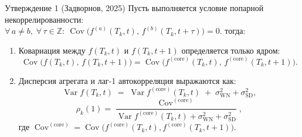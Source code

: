 \documentclass[14pt,a4paper]{article}
\begin{document}
\begin{theorem}{Утверждение 1 (Задворнов, 2025)}
Пусть выполняется условие попарной некоррелированности:
\(
  \forall\,a \neq b,\;\forall\,\tau \in \mathbb{Z}:\ 
  \operatorname{Cov}\bigl(f^{(a)}(T_k,t),\,f^{(b)}(T_k,t+\tau)\bigr) = 0.
\)
тогда:
\begin{enumerate}
\item Ковариация между \(f(T_k,t)\) и \(f(T_k,t+1)\) определяется только ядром:
  \[
    \operatorname{Cov}\bigl(f(T_k,t),\,f(T_k,t+1)\bigr)
    =
    \operatorname{Cov}\bigl(f^{(\mathrm{core})}(T_k,t),\,f^{(\mathrm{core})}(T_k,t+1)\bigr).
  \]
\item Дисперсия агрегата и лаг-1 автокорреляция выражаются как:
  \[
    \operatorname{Var} f(T_k,t)
    \;=\;
    \operatorname{Var} f^{(\mathrm{core})}(T_k,t)
    \;+\;\sigma_{\mathrm{WN}}^{2}+\sigma_{\mathrm{SD}}^{2},
  \]
  \[
    \rho_{k}(1)
    =
    \frac{\operatorname{Cov}^{(\mathrm{core})}}
         {\operatorname{Var} f^{(\mathrm{core})}(T_k,t) + \sigma_{\mathrm{WN}}^{2} + \sigma_{\mathrm{SD}}^{2}},
  \]
  где \(\operatorname{Cov}^{(\mathrm{core})} = \operatorname{Cov}\bigl(f^{(\mathrm{core})}(T_k,t), f^{(\mathrm{core})}(T_k,t+1)\bigr)\).
\end{enumerate}
\end{theorem}
\end{document}

